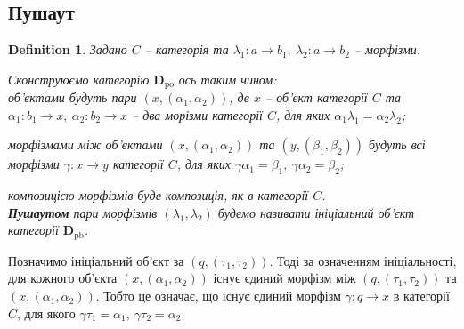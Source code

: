 \documentclass[a4paper, 10pt]{article}
\theoremstyle{theoremdd}
\newtheorem{definition}[theorem]{Definition}
\begin{document}
\subsection{Пушаут}
\begin{definition}
Задано $C$ -- категорія та $\lambda_1 \colon a \to b_1,\ \lambda_2 \colon a \to b_2$ -- морфізми.
\begin{figure}[H]
\centering
{}
\end{figure}
\noindent
Сконструюємо категорію $\textbf{D}_{\text{po}}$ ось таким чином:\\
об'єктами будуть пари $(x,(\alpha_1,\alpha_2))$, де $x$ -- об'єкт категорії $C$ та $\alpha_1 \colon b_1 \to x,\ \alpha_2 \colon b_2 \to x$ -- два морізми категорії $C$, для яких $\alpha_1 \lambda_1 = \alpha_2 \lambda_2$;
\begin{figure}[H]
\centering
{}
\end{figure}
\noindent
морфізмами між об'єктами $(x,(\alpha_1,\alpha_2))$ та $(y,(\beta_1,\beta_2))$ будуть всі морфізми $\gamma \colon x \to y$ категорії $C$, для яких $\gamma \alpha_1 = \beta_1,\ \gamma \alpha_2 = \beta_2$;
\begin{figure}[H]
\centering
{}
\end{figure}
\noindent
композицією морфізмів буде композиція, як в категорії $C$.\\
\textbf{Пушаутом} пари морфізмів $(\lambda_1,\lambda_2)$ будемо називати ініціальний об'єкт категорії $\textbf{D}_{\text{pb}}$.
\end{definition}
\noindent
Позначимо ініціальний об'єкт за $(q,(\tau_1,\tau_2))$. Тоді за означенням ініціальності, для кожного об'єкта $(x,(\alpha_1,\alpha_2))$ існує єдиний морфізм між $(q,(\tau_1,\tau_2))$ та $(x,(\alpha_1,\alpha_2))$. Тобто це означає, що існує єдиний морфізм $\gamma \colon q \to x$ в категорії $C$, для якого $\gamma  \tau_1 = \alpha_1,\ \gamma \tau_2 = \alpha_2$. 
\begin{figure}[H]
\centering
{}
\end{figure}
\end{document}

